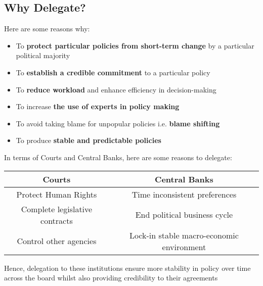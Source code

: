 \documentclass[12pt, letterpaper]{article}
\begin{document}
\subsection{Why Delegate?}
Here are some reasons why:
\begin{itemize}
	\item To \textbf{protect particular policies from short-term change} by a particular political majority
	\item To \textbf{establish a credible commitment} to a particular policy
	\item To \textbf{reduce workload} and enhance efficiency in decision-making
	\item To increase \textbf{the use of experts in policy making}
	\item To avoid taking blame for unpopular policies i.e. \textbf{blame shifting}
	\item To produce \textbf{stable and predictable policies}
\end{itemize}
In terms of Courts and Central Banks, here are some reasons to delegate:
\begin{center}
\begin{tabular}{c|c}
Courts & Central Banks\\
\hline
Protect Human Rights & Time inconsistent preferences\\
Complete legislative contracts & End political business cycle\\
Control other agencies & Lock-in stable macro-economic environment\\
\hline
\end{tabular}
\end{center}
Hence, delegation to these institutions ensure more stability in policy over time across the board whilst also providing credibility to their agreements
\end{document}
